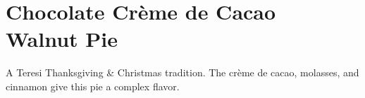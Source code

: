 \section[Chocolate Walnut Pie]{
    Chocolate Cr\`{e}me de Cacao\\ Walnut Pie
}

\begin{recipestats}[
        servings=1 pie,
        preptime=20 \minute,
        bakingtime=40 \minute,
        source=\citefield{pie2004}{title}~\cite{pie2004},
    ]
\end{recipestats}

\begin{recipeabstract}
    A Teresi Thanksgiving \& Christmas tradition.
    The cr\`{e}me de cacao, molasses, and cinnamon give this pie a complex flavor.
\end{recipeabstract}

\begin{ingredientcolumns}
    \begin{ingredientblock}
        \\
        \\
        \\
        \\
        \\
        \\
    \end{ingredientblock}
    \begin{ingredientblock}
        \\
        \\
        \\
        \\
        \\
    \end{ingredientblock}
\end{ingredientcolumns}

